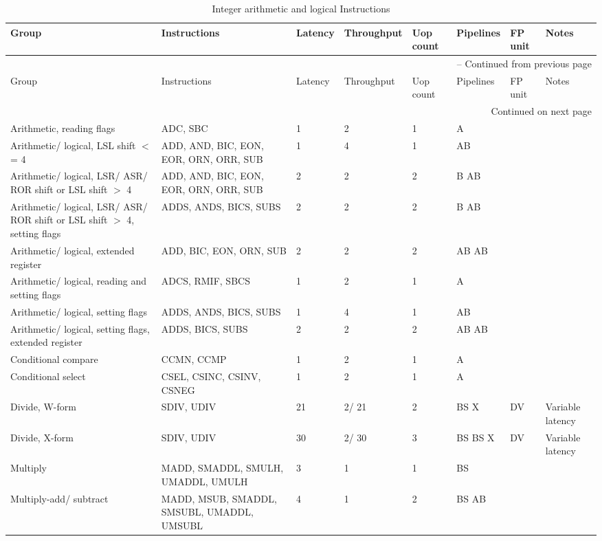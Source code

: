 \begin{longtable}{|p{1in}|p{1in}|l|l|l|p{1in}|l|p{1in}|}
\caption{Integer arithmetic and logical Instructions} \\
\hline
Group & Instructions & Latency & Throughput & Uop count & Pipelines & FP unit & Notes\\
\hline
\endfirsthead
\hline
\multicolumn{8}{|r|}{{\tablename\ \thetable{} -- Continued from previous page}} \\
\hline
Group & Instructions & Latency & Throughput & Uop count & Pipelines & FP unit & Notes\\
\hline
\endhead
\hline
\multicolumn{8}{|r|}{{Continued on next page}} \\
\hline
\endfoot
\hline
\endlastfoot
Arithmetic, reading flags & ADC, SBC & 1 & 2 & 1 & A &  & \\
\hline
Arithmetic/ logical, LSL shift $<$= 4 & ADD, AND, BIC, EON, EOR, ORN, ORR, SUB & 1 & 4 & 1 & AB &  & \\
\hline
Arithmetic/ logical, LSR/ ASR/ ROR shift or LSL shift $>$ 4 & ADD, AND, BIC, EON, EOR, ORN, ORR, SUB & 2 & 2 & 2 & B AB &  & \\
\hline
Arithmetic/ logical, LSR/ ASR/ ROR shift or LSL shift $>$ 4, setting flags & ADDS, ANDS, BICS, SUBS & 2 & 2 & 2 & B AB &  & \\
\hline
Arithmetic/ logical, extended register & ADD, BIC, EON, ORN, SUB & 2 & 2 & 2 & AB AB &  & \\
\hline
Arithmetic/ logical, reading and setting flags & ADCS, RMIF, SBCS & 1 & 2 & 1 & A &  & \\
\hline
Arithmetic/ logical, setting flags & ADDS, ANDS, BICS, SUBS & 1 & 4 & 1 & AB &  & \\
\hline
Arithmetic/ logical, setting flags, extended register & ADDS, BICS, SUBS & 2 & 2 & 2 & AB AB &  & \\
\hline
Conditional compare & CCMN, CCMP & 1 & 2 & 1 & A &  & \\
\hline
Conditional select & CSEL, CSINC, CSINV, CSNEG & 1 & 2 & 1 & A &  & \\
\hline
Divide, W-form & SDIV, UDIV & 21 & 2/ 21 & 2 & BS X & DV & Variable latency\\
\hline
Divide, X-form & SDIV, UDIV & 30 & 2/ 30 & 3 & BS BS X & DV & Variable latency\\
\hline
Multiply & MADD, SMADDL, SMULH, UMADDL, UMULH & 3 & 1 & 1 & BS &  & \\
\hline
Multiply-add/ subtract & MADD, MSUB, SMADDL, SMSUBL, UMADDL, UMSUBL & 4 & 1 & 2 & BS AB &  & \\
\hline
\end{longtable}

